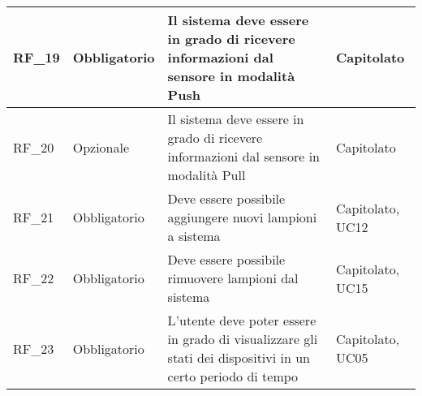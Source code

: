 \begin{center}
\begin{xltabular}{\linewidth}{|l|l|X|l|}
        \hline
        RF\_19 & Obbligatorio & Il sistema deve essere in grado di ricevere informazioni dal sensore in modalità Push & Capitolato \\

        \hline
        RF\_20 & Opzionale & Il sistema deve essere in grado di ricevere informazioni dal sensore in modalità Pull & Capitolato \\
        
        \hline
        RF\_21 & Obbligatorio & Deve essere possibile aggiungere nuovi lampioni a sistema & Capitolato, UC12 \\

        \hline
        RF\_22 & Obbligatorio & Deve essere possibile rimuovere lampioni dal sistema & Capitolato, UC15 \\
        
        \hline
        RF\_23 & Obbligatorio & L'utente deve poter essere in grado di visualizzare gli stati dei dispositivi in un certo periodo di tempo & Capitolato, UC05 \\

        \hline
    \end{xltabular}
\end{center}


